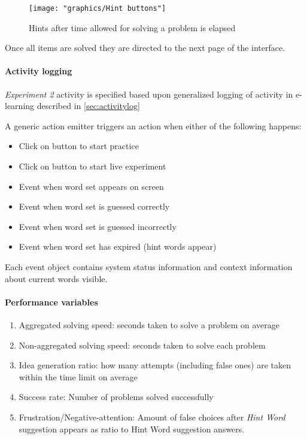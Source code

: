 		\begin{figure}
			\centering
			\texttt{[image: "graphics/Hint buttons"]}
			\caption{Hints after time allowed for solving a problem is elapsed}
			\label{fig:hint-buttons}
		\end{figure}
		
		
		Once all items are solved they are directed to the next page of the interface.
				
		\paragraph{Activity logging} \textit{Experiment 2} activity is specified based upon generalized logging of activity in e-learning described in \ref{sec:activitylog}
		
		A generic action emitter triggers an action when either of the following happens:
		
		\begin{itemize}
			\item Click on button to start practice
			\item Click on button to start live experiment
			\item Event when word set appears on screen
			\item Event when word set is guessed correctly
			\item Event when word set is guessed incorrectly
			\item Event when word set has expired (hint words appear)
		\end{itemize}
	
		Each event object contains system status information and context information about current words visible.

		\paragraph{Performance variables} \label{sec:creativity-parameters}
		
		\begin{enumerate}
			\item Aggregated solving speed: seconds taken to solve a problem on average
			\item Non-aggregated solving speed: seconds taken to solve each problem
			\item Idea generation ratio: how many attempts (including false ones) are taken within the time limit on average
			\item Success rate: Number of problems solved successfully
			\item Frustration/Negative-attention: Amount of false choices after \textit{Hint Word} suggestion appears as ratio to Hint Word suggestion answers.
		\end{enumerate}
	
